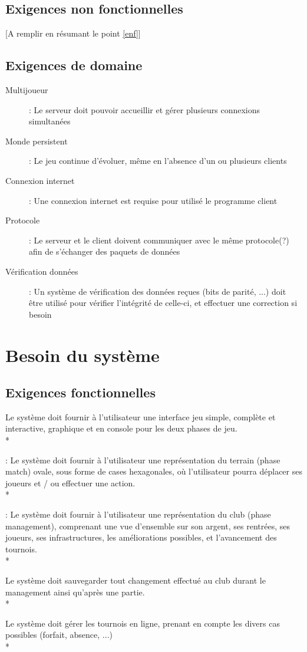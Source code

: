 \documentclass[a4paper]{article}
\begin{document}
\subsection{Exigences non fonctionnelles}
[A remplir en résumant le point \ref{enf}]

\subsection{Exigences de domaine}
\begin{description}
\item[Multijoueur] : Le serveur doit pouvoir accueillir et gérer plusieurs connexions simultanées
\item[Monde persistent] : Le jeu continue d'évoluer, même en l'absence d'un ou plusieurs clients
\item[Connexion internet] : Une connexion internet est requise pour utilisé le programme client
\item[Protocole] : Le serveur et le client doivent communiquer avec le même protocole(?) afin de s'échanger des paquets de données
\item[Vérification données] : Un système de vérification des données reçues (bits de parité, ...) doit être utilisé pour vérifier l'intégrité de celle-ci, et effectuer une correction si besoin
\end{description}

\section{Besoin du système}
	\subsection{Exigences fonctionnelles}
		\begin{description}[style=nextline]
			\item[Interface :]Le système doit fournir à l'utilisateur une interface jeu simple, complète et interactive, graphique et en console pour les deux phases de jeu.\\*
			\item[Représentation phase match] : Le système doit fournir à l'utilisateur une représentation du terrain (phase match) ovale, sous forme de cases hexagonales, où l'utilisateur pourra déplacer ses joueurs et / ou effectuer une action.\\*
			\item[Représentation phase management] : Le système doit fournir à l'utilisateur une représentation du \gls{club} (phase management), comprenant une vue d'ensemble sur son argent, ses rentrées, ses joueurs, ses infrastructures, les améliorations possibles, et l'avancement des tournois.\\*
			\item[Sauvegarde :]Le système doit sauvegarder tout changement effectué au \gls{club} durant le management ainsi qu'après une partie.\\*
			\item[Tournois :]Le système doit gérer les tournois en ligne, prenant en compte les divers cas possibles (forfait, absence, ...)\\*
		\end{description}
\end{document}
